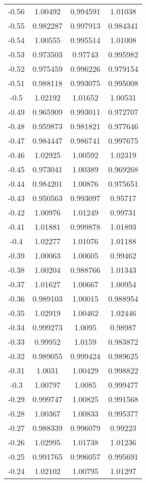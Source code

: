 \begin{table}[h!]
\begin{tabular}{|c|c|c|c|}
-0.56 & 1.00492 & 0.994591 & 1.01038 \\
-0.55 & 0.982287 & 0.997913 & 0.984341 \\
-0.54 & 1.00555 & 0.995514 & 1.01008 \\
-0.53 & 0.973503 & 0.97743 & 0.995982 \\
-0.52 & 0.975459 & 0.996226 & 0.979154 \\
-0.51 & 0.988118 & 0.993075 & 0.995008 \\
-0.5 & 1.02192 & 1.01652 & 1.00531 \\
-0.49 & 0.965909 & 0.993011 & 0.972707 \\
-0.48 & 0.959873 & 0.981821 & 0.977646 \\
-0.47 & 0.984447 & 0.986741 & 0.997675 \\
-0.46 & 1.02925 & 1.00592 & 1.02319 \\
-0.45 & 0.973041 & 1.00389 & 0.969268 \\
-0.44 & 0.984201 & 1.00876 & 0.975651 \\
-0.43 & 0.950563 & 0.993097 & 0.95717 \\
-0.42 & 1.00976 & 1.01249 & 0.99731 \\
-0.41 & 1.01881 & 0.999878 & 1.01893 \\
-0.4 & 1.02277 & 1.01076 & 1.01188 \\
-0.39 & 1.00063 & 1.00605 & 0.99462 \\
-0.38 & 1.00204 & 0.988766 & 1.01343 \\
-0.37 & 1.01627 & 1.00667 & 1.00954 \\
-0.36 & 0.989103 & 1.00015 & 0.988954 \\
-0.35 & 1.02919 & 1.00462 & 1.02446 \\
-0.34 & 0.999273 & 1.0095 & 0.98987 \\
-0.33 & 0.99952 & 1.0159 & 0.983872 \\
-0.32 & 0.989055 & 0.999424 & 0.989625 \\
-0.31 & 1.0031 & 1.00429 & 0.998822 \\
-0.3 & 1.00797 & 1.0085 & 0.999477 \\
-0.29 & 0.999747 & 1.00825 & 0.991568 \\
-0.28 & 1.00367 & 1.00833 & 0.995377 \\
-0.27 & 0.988339 & 0.996079 & 0.99223 \\
-0.26 & 1.02995 & 1.01738 & 1.01236 \\
-0.25 & 0.991765 & 0.996057 & 0.995691 \\
-0.24 & 1.02102 & 1.00795 & 1.01297 \\

\end{tabular}
\end{table}
